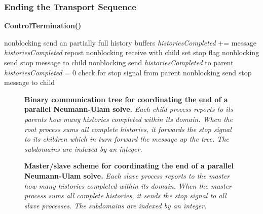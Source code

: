 \subsubsection{Ending the Transport Sequence}
\label{subsubsec:ending_transport}

\begin{algorithm}[h!]
  \caption{\textbf{ControlTermination()}}
  \label{alg:control_termination}
  \begin{algorithmic}[1]
    \State nonblocking send an partially full history buffers
    \State \textit{historiesCompleted} += message \textit{historiesCompleted}
    \State repost nonblocking receive with child
    \EndFor
    \State set stop flag
    \State nonblocking send stop message to child
    \EndFor
    \EndIf
    \Else
    \State nonblocking send \textit{historiesCompleted} to parent
    \State \textit{historiesCompleted} = 0
    \State check for stop signal from parent
    \State nonblocking send stop message to child
    \EndFor
    \EndIf
    \EndIf
  \end{algorithmic}
\end{algorithm}

\begin{figure}[htpb!]
  \begin{center}
    \scalebox{1.25}{
       }
    \caption{\textbf{Binary communication tree for coordinating the
        end of a parallel Neumann-Ulam solve.} \textit{Each child
        process reports to its parents how many histories completed
        within its domain. When the root process sums all complete
        histories, it forwards the stop signal to its children which
        in turn forward the message up the tree. The subdomains are
        indexed by an integer.}}
  \end{center}
  \label{fig:binary_comm_tree}
\end{figure}

\begin{figure}[htpb!]
  \begin{center}
    \scalebox{0.75}{
       }
    \caption{\textbf{Master/slave scheme for coordinating the end of a
        parallel Neumann-Ulam solve.} \textit{Each slave process
        reports to the master how many histories completed within its
        domain. When the master process sums all complete histories,
        it sends the stop signal to all slave processes. The
        subdomains are indexed by an integer.}}
  \end{center}
  \label{fig:master_comm_tree}
\end{figure}

